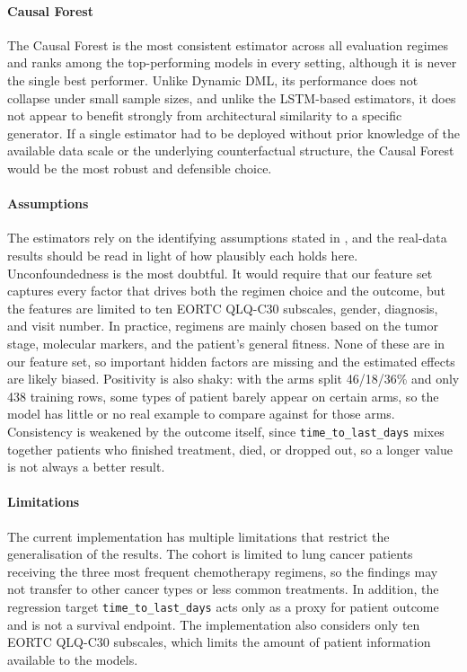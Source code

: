 \documentclass{article}
\begin{document}
\paragraph{Causal Forest}
The Causal Forest is the most consistent estimator across all evaluation
regimes and ranks among the top-performing models in every setting,
although it is never the single best performer. Unlike Dynamic DML, its
performance does not collapse under small sample sizes, and unlike the
LSTM-based estimators, it does not appear to benefit strongly from
architectural similarity to a specific generator. If a single estimator
had to be deployed without prior knowledge of the available data scale
or the underlying counterfactual structure, the Causal Forest would be
the most robust and defensible choice.

\paragraph{Assumptions}
The estimators rely on the identifying assumptions stated in
, and the real-data results should be read in light of how
plausibly each holds here. Unconfoundedness is the most doubtful. It would require
that our feature set captures every factor that drives both the regimen choice and
the outcome, but the features are limited to ten EORTC QLQ-C30 subscales, gender,
diagnosis, and visit number. In practice, regimens are mainly chosen based on the
tumor stage, molecular markers, and the patient's general fitness. None of these are
in our feature set, so important hidden factors are missing and the estimated effects
are likely biased. Positivity is also shaky: with the arms split 46/18/36\% and only
438 training rows, some types of patient barely appear on certain arms, so the model
has little or no real example to compare against for those arms. Consistency is
weakened by the outcome itself, since \texttt{time\_to\_last\_days} mixes together
patients who finished treatment, died, or dropped out, so a longer value is not always
a better result.


\paragraph{Limitations}
The current implementation has multiple limitations that restrict the
generalisation of the results. The cohort is limited to lung cancer
patients receiving the three most frequent chemotherapy regimens, so
the findings may not transfer to other cancer types or less common
treatments. In addition, the regression target
\texttt{time\_to\_last\_days} acts only as a proxy for patient outcome
and is not a survival endpoint. The implementation
also considers only ten EORTC QLQ-C30 subscales, which limits the
amount of patient information available to the models.
\end{document}
